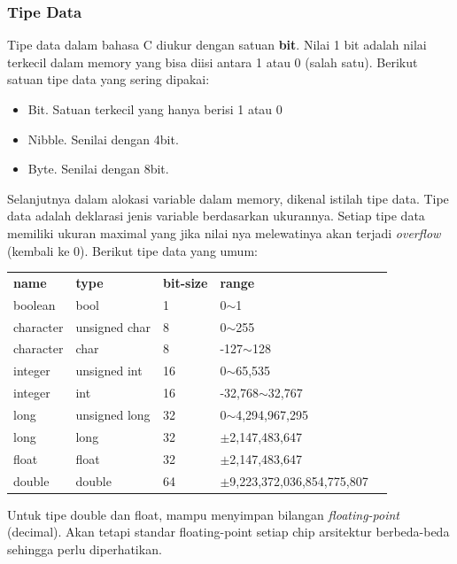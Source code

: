 \documentclass[12pt,]{article}
\begin{document}
	\subsubsection{Tipe Data}
	Tipe data dalam bahasa C diukur dengan satuan \textbf{bit}.
	Nilai 1 bit adalah nilai terkecil dalam memory yang bisa diisi antara 1 atau 0 (salah satu).
	Berikut satuan tipe data yang sering dipakai:
	\begin{itemize}
		\item Bit. Satuan terkecil yang hanya berisi 1 atau 0
		\item Nibble. Senilai dengan 4bit.
		\item Byte. Senilai dengan 8bit.
	\end{itemize}
	
	Selanjutnya dalam alokasi variable dalam memory, dikenal istilah tipe data.
	Tipe data adalah deklarasi jenis variable berdasarkan ukurannya.
	Setiap tipe data memiliki ukuran maximal yang jika nilai nya melewatinya akan terjadi \textit{overflow} (kembali ke 0).
	Berikut tipe data yang umum:
	\begin{table}[H]
		\begin{tabular}{|l|l|l|l|l}
			\cline{1-4}
			\textbf{name}      & \textbf{type}          & \textbf{bit-size} & \textbf{range}         &  \\ \cline{1-4}
			boolean   & bool          & 1  & 0$\sim$1             &  \\ \cline{1-4}
			character & unsigned char & 8  & 0$\sim$255           &  \\ \cline{1-4}
			character & char          & 8  & -127$\sim$128        &  \\ \cline{1-4}
			integer   & unsigned int  & 16 & 0$\sim$65,535        &  \\ \cline{1-4}
			integer   & int  		  & 16 & -32,768$\sim$32,767  &  \\ \cline{1-4}
			long	  & unsigned long & 32 & 0$\sim$4,294,967,295 &  \\ \cline{1-4}
			long	  & long 		  & 32 & $\pm$2,147,483,647	  &  \\ \cline{1-4}
			float	  & float 		  & 32 & $\pm$2,147,483,647	  &  \\ \cline{1-4}
			double	  & double 		  & 64 & $\pm$9,223,372,036,854,775,807	&  \\ \cline{1-4}
		\end{tabular}
	\end{table}
	Untuk tipe double dan float, mampu menyimpan bilangan \textit{floating-point} (decimal).
	Akan tetapi standar floating-point setiap chip arsitektur berbeda-beda sehingga perlu diperhatikan.
	
\end{document}
